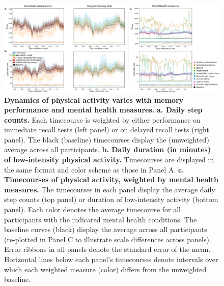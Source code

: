 \documentclass[10pt]{article}
\begin{document}
\begin{figure}[tp]
\centering
\includegraphics[width=\textwidth]{figs/weighted_timecourse_summary}
\caption{\textbf{Dynamics of physical activity varies with memory
    performance and mental health measures.}  \textbf{a. Daily step counts.}  Each
  timecourse is weighted by either performance on immediate recall tests
  (left panel) or on delayed recall tests (right panel).  The black
  (baseline) timecourses display the (unweighted) average across all
  participants.  \textbf{b. Daily duration (in minutes) of low-intensity physical
    activity.}  Timecourses are displayed in the same format and color
scheme as those in Panel A.  \textbf{c. Timecourses of physical
  activity, weighted by mental health measures.}  The timecourses in
each panel display the average daily step counts (top panel) or
duration of low-intensity activity (bottom panel).  Each color denotes
the average timecourse for all participants with the indicated
mental health conditions.  The baseline curves (black) display the
average across all participants (re-plotted in Panel C to illustrate
scale differences across panels).  Error ribbons in all panels denote
the standard error of the mean.  Horizontal lines below each panel's
timecourses denote intervals over which each weighted measure (color) differs
from the unweighted baseline.}
\label{fig:dynamics}
\end{figure}
\end{document}

